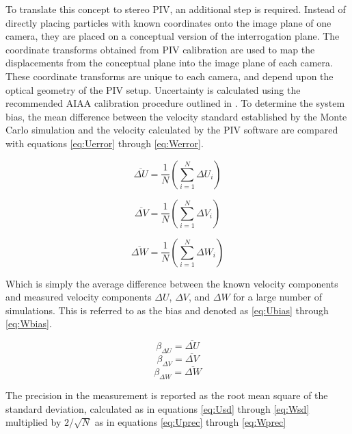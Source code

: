 To translate this concept to stereo PIV, an additional step is required. 
Instead of directly placing particles with known coordinates onto the image 
plane of one camera, they are placed on a conceptual version of the 
interrogation plane. The coordinate transforms obtained from PIV calibration 
are used to map the displacements from the conceptual plane into the image 
plane of each camera. These coordinate transforms are unique to each camera, 
and depend upon the optical geometry of the PIV setup. Uncertainty is 
calculated using the recommended AIAA calibration procedure outlined in 
\cite{PIVuncertAIAA}. To determine the system bias, the mean difference between 
the velocity standard established by the Monte Carlo simulation and the 
velocity calculated by the PIV software are compared with equations 
\ref{eq:Uerror} through \ref{eq:Werror}.

\begin{equation}
\overline{\Delta U} = \frac{1}{N} \left(\sum_{i=1}^N \Delta U_i \right)
\label{eq:Uerror}
\end{equation}

\begin{equation}
\overline{\Delta V} = \frac{1}{N} \left(\sum_{i=1}^N \Delta V_i \right)
\label{eq:Verror}
\end{equation}

\begin{equation}
\overline{\Delta W} = \frac{1}{N} \left(\sum_{i=1}^N \Delta W_i \right)
\label{eq:Werror}
\end{equation}

Which is simply the average difference between the known velocity components 
and measured velocity components $\Delta U$, $\Delta V$, and $\Delta W$ for a 
large number of simulations. This is referred to as the bias and denoted as 
\ref{eq:Ubias} through \ref{eq:Wbias}.

\begin{equation}
\beta_{\Delta U} = \overline{\Delta U}
\label{eq:Ubias}
\end{equation}
\begin{equation}
\beta_{\Delta V} = \overline{\Delta V}
\label{eq:Vbias}
\end{equation}
\begin{equation}
\beta_{\Delta W} = \overline{\Delta W}
\label{eq:Wbias}
\end{equation}

The precision in the measurement is reported as the root mean square of the  
standard deviation, calculated as in equations \ref{eq:Usd} through 
\ref{eq:Wsd} multiplied by $2 / \sqrt{N}$ as in equations \ref{eq:Uprec} 
through \ref{eq:Wprec}
	
